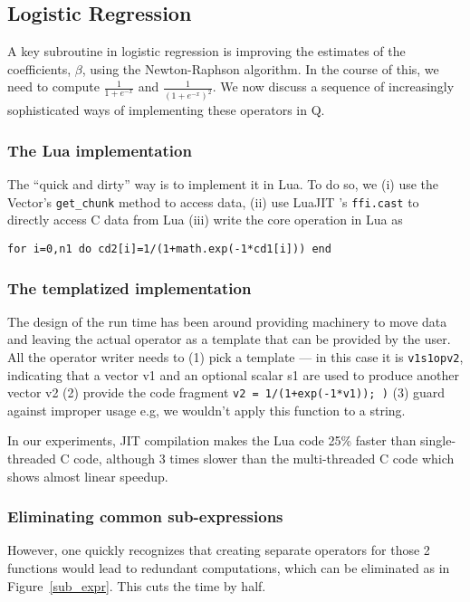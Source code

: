 \subsection{Logistic Regression}

A key subroutine in logistic regression \cite{Hastie2009} is improving the 
estimates of the
coefficients, \(\beta\), using the Newton-Raphson algorithm.
In the course of this, we need to compute
\(\frac{1}{1 + e^{-x}}\) and 
\(\frac{1}{(1 + e^{-x})^2}\).
We now discuss a sequence of increasingly sophisticated ways of implementing
these operators in Q.

\subsubsection{The Lua implementation}
\label{Logit_Lua}
The ``quick and dirty'' way is to implement it in Lua. To do so, we 
(i) use the Vector's {\tt get\_chunk} method to access data, 
(ii) use LuaJIT 's {\tt ffi.cast} to directly access C data from Lua 
(iii) write the core operation in Lua as
\begin{verbatim}
for i=0,n1 do cd2[i]=1/(1+math.exp(-1*cd1[i])) end
\end{verbatim}

\subsubsection{The templatized implementation}
\label{Logit_template}
The design
of the run time has been around providing machinery to move data and leaving
the actual operator as a template that can be provided by the user. All the operator
writer needs to (1) pick a template --- in this case it is {\tt v1s1opv2}, indicating that a
vector v1 and an optional scalar s1 are used to produce another vector v2
(2) provide the code fragment {\tt  v2 = 1/(1+exp(-1*v1)); )} (3)
guard against improper usage e.g, we wouldn't apply this function to a string.

In our experiments, 
JIT compilation makes the Lua code 25\% faster than single-threaded C code,
although 3 times slower than the multi-threaded C code which shows almost linear
speedup.

\subsubsection{Eliminating common sub-expressions}
However, one quickly recognizes that creating separate operators for those 2
functions would lead to 
redundant computations, which can be eliminated as in Figure~\ref{sub_expr}.
This cuts the time by half.

